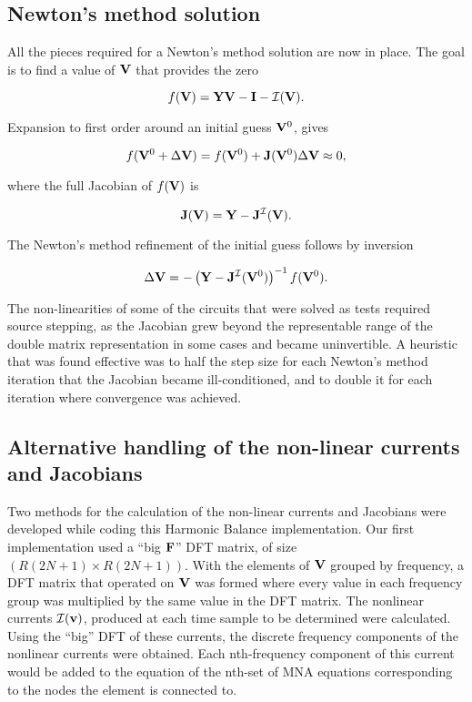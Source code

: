 \documentclass[12pt,journal,compsoc]{../ieeepaper/IEEEtran}
\begin{document}
\subsection{Newton's method solution}

All the pieces required for a Newton's method solution are now in place.  The goal is to find a value of \( \mathbf{V} \) that provides the zero

\begin{dmath}\label{eqn:ece1254projectReport:1220}
f(\BV) = \BY \BV - \BI - \mathcal{I}(\BV).
\end{dmath}

Expansion to first order around an initial guess \( \mathbf{V}^0 \), gives

\begin{dmath}\label{eqn:ece1254projectReport:1240}
f( \BV^0 + \Delta \BV ) = f(\BV^0) + \BJ(\BV^0) \Delta \BV \approx 0,
\end{dmath}

where the full Jacobian of \( f(\mathbf{V}) \) is

\begin{dmath}\label{eqn:ece1254projectReport:1260}
\BJ(\BV) = \BY - \BJ^{\mathcal{I}}(\BV).
\end{dmath}

The Newton's method refinement of the initial guess follows by inversion

\begin{dmath}\label{eqn:ece1254projectReport:1280}
\Delta \BV = -\lr{ \BY - \BJ^{\mathcal{I}}(\BV^0) }^{-1} f(\BV^0).
\end{dmath}

The non-linearities of some of the circuits that were solved as tests required source stepping, as the Jacobian grew beyond the representable range of the double matrix representation in some cases and became uninvertible.  A heuristic that was found effective was to half the step size for each Newton's method iteration that the Jacobian became ill-conditioned, and to double it for each iteration where convergence was achieved.

\subsection{Alternative handling of the non-linear currents and Jacobians}

Two methods for the calculation of the non-linear currents and Jacobians were developed while coding this Harmonic Balance implementation.  
Our first implementation used 
a ``big \( \mathbf{F} \)'' DFT matrix, of size \( ( R (2 N + 1 ) \times R (2 N + 1) ) \).  
With the elements of \( \mathbf{V} \) grouped by frequency, a DFT matrix that operated on \( \mathbf{V} \) was formed where
every value in each frequency group was multiplied by the same value in the DFT matrix.
The nonlinear currents \( \mathcal{I}(\mathbf{v}) \), produced at each time sample to be determined were calculated.  Using the 
``big'' DFT of these currents, the discrete frequency
components of the nonlinear currents were obtained.
Each nth-frequency component of this current would be added
to the equation of the nth-set of MNA equations corresponding to the nodes the element is connected
to.
\end{document}
